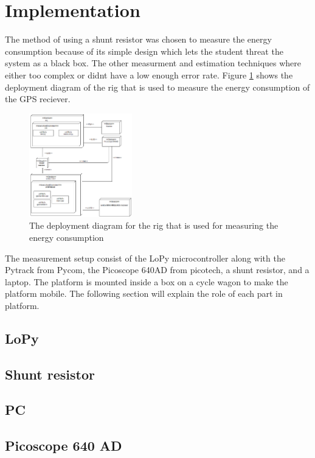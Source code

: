 \section{Implementation}

The method of using a shunt resistor was chosen to measure the energy consumption because of its simple design which lets the student threat the system as a black box. The other measurment and estimation techniques where either too complex or didnt have a low enough error rate. Figure \ref{fig:deploy} shows the deployment diagram of the rig that is used to measure the energy consumption of the GPS reciever. 

\begin{figure}[H]
\centering
\includegraphics[height=4.5cm]{Project_Report/Images/deploy.PNG}
\caption{The deployment diagram for the rig that is used for measuring the energy consumption}
\label{fig:deploy}
\end{figure}

The measurement setup consist of the LoPy microcontroller along with the Pytrack from Pycom, the Picoscope 640AD from picotech, a shunt resistor, and a laptop. The platform is mounted inside a box on a cycle wagon to make the platform mobile. The following section will explain the role of each part in platform.

\subsection{LoPy}
\subsection{Shunt resistor}
\subsection{PC}
\subsection{Picoscope 640 AD}


\newpage